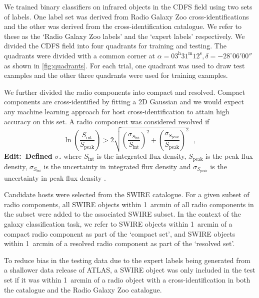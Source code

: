 \documentclass[fleqn,usenatbib,usedcolumn]{mnras}
\newcommand{\edit}[1]{{\bf Edit:~{#1}}}
\begin{document}
    We trained binary classifiers on infrared objects in the CDFS field using two sets of labels. One label set was derived from
    Radio Galaxy Zoo cross-identifications and the other was derived from the
    \citet{norris06} cross-identification catalogue. We refer to these as the
    `Radio Galaxy Zoo labels' and the `expert labels' respectively. We divided the
    CDFS field into four quadrants for training and testing. The quadrants
    were divided with a common corner at $\alpha = 03^\text{h}31^\text{m}12^\text{s},
    \delta = -28^\circ{}06'00''$ as shown in \autoref{fig:quadrants}. For
    each trial, one quadrant was used to draw test examples and the other three
    quadrants were used for training examples.

    We further divided the radio components into compact and resolved. Compact
    components are cross-identified by fitting a 2D Gaussian \citep[as
    in][]{norris06} and we would expect any machine learning approach for host
    cross-identification to attain high accuracy on this set. A radio component was
    considered resolved if
    \begin{equation}
        \ln \left(
          \frac{S_{\text{int}}}
               {S_{\text{peak}}}
        \right) > 2\sqrt{\left(
          \frac{\sigma_{S_{\text{int}}}}
               {S_{\text{int}}}
        \right)^2 + \left(
          \frac{\sigma_{S_{\text{peak}}}}
               {S_{\text{peak}}}
        \right)^2}\,\,\,\,,
    \end{equation}%
    \edit{Defined $\sigma$.} where \(S_{\text{int}}\) is the integrated flux density, \(S_{\text{peak}}\) is the peak flux density, $\sigma_{S_{\text{int}}}$ is the uncertainty in integrated flux density and $\sigma_{S_{\text{peak}}}$ is the uncertainty in peak flux density \citep[following][]{franzen15}.

    Candidate hosts were selected from the SWIRE catalogue. For a given subset
    of radio components, all SWIRE objects within 1~arcmin of all radio
    components in the subset were added to the associated SWIRE subset. In the
    context of the galaxy classification task, we refer to SWIRE objects
    within 1~arcmin of a compact radio component as part of the `compact set',
    and SWIRE objects within 1~arcmin of a resolved radio component as part of
    the `resolved set'.

    To reduce
    bias in the testing data due to the expert labels being generated from a
    shallower data release of ATLAS, a SWIRE object was only included in the test
    set if it was within 1~arcmin of a radio object with a cross-identification
    in both the \citet{norris06} catalogue and the Radio Galaxy Zoo catalogue.
\end{document}
